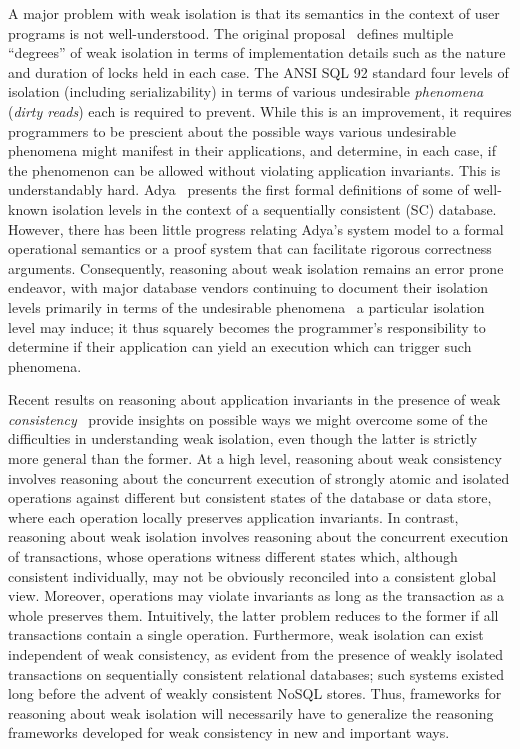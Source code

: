 A major problem with weak isolation is that its semantics in the
context of user programs is not well-understood. The original
proposal~\cite{gray1976} defines multiple ``degrees'' of weak
isolation in terms of implementation details such as the nature and
duration of locks held in each case. The ANSI SQL 92 standard four
levels of isolation (including serializability) in terms of various
undesirable \emph{phenomena} (\eg \emph{dirty reads}) each is required
to prevent. While this is an improvement, it requires programmers to
be prescient about the possible ways various undesirable phenomena
might manifest in their applications, and determine, in each case, if
the phenomenon can be allowed without violating application
invariants. This is understandably hard. Adya~\cite{adyaphd} presents
the first formal definitions of some of well-known isolation levels in
the context of a sequentially consistent (SC) database.  However,
there has been little progress relating Adya's system model to a
formal operational semantics or a proof system that can facilitate
rigorous correctness arguments.  Consequently, reasoning about weak
isolation remains an error prone endeavor, with major database vendors
continuing to document their isolation levels primarily in terms of
the undesirable phenomena~\cite{postgresiso, mysqliso, oracleiso} a
particular isolation level may induce; it thus squarely becomes the
programmer's responsibility to determine if their application can
yield an execution which can trigger such phenomena.

Recent results on reasoning about application invariants in the
presence of weak \emph{consistency}~\cite{burckhardt14, redblueosdi,
  redblueatc, ecinec, gotsmanpopl16} provide insights on possible ways
we might overcome some of the difficulties in understanding weak
isolation, even though the latter is strictly more general than the
former.  At a high level, reasoning about weak consistency involves
reasoning about the concurrent execution of strongly atomic and
isolated operations against different but consistent states of the
database or data store, where each operation locally preserves
application invariants. In contrast, reasoning about weak isolation
involves reasoning about the concurrent execution of transactions,
whose operations witness different states which, although consistent
individually, may not be obviously reconciled into a consistent global
view.  Moreover, operations may violate invariants as long as the
transaction as a whole preserves them.  Intuitively, the latter
problem reduces to the former if all transactions contain a single
operation. Furthermore, weak isolation can exist independent of weak
consistency, as evident from the presence of weakly isolated
transactions on sequentially consistent relational databases; such
systems existed long before the advent of weakly consistent NoSQL
stores.  Thus, frameworks for reasoning about weak isolation will
necessarily have to generalize the reasoning frameworks developed for
weak consistency in new and important ways.

